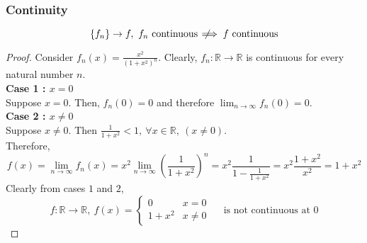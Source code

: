 \subsubsection{Continuity}
\[ \left\{f_n\right\} \to f,\ f_n \text{ continuous } \not\!\!\!\implies f \text{ continuous} \]
\begin{proof}
Consider $f_n(x) = \frac{x^2}{(1+x^2)^n}$.
	Clearly, $f_n : \mathbb{R} \to \mathbb{R}$ is continuous for every natural number $n$.\\

\textbf{Case 1 : $x = 0$}\\
Suppose $x = 0$.
Then, $f_n(0) = 0$ and therefore $\displaystyle\lim_{n \to \infty} f_n(0) = 0$. \\

\textbf{Case 2 : $x \ne 0$}\\
	Suppose $x \ne 0$.
	Then $\frac{1}{1+x^2} < 1,\ \forall x \in \mathbb{R},\ (x \ne 0)$.\\
Therefore,
\[ f(x) = \lim_{n \to \infty} f_n(x) = x^2 \lim_{n \to \infty} \left(\frac{1}{1+x^2}\right)^n = x^2 \frac{1}{1-\frac{1}{1+x^2}} = x^2 \frac{1+x^2}{x^2} = 1+x^2 \]
	Clearly from cases $1$ and $2$,\\
	\[ f : \mathbb{R} \to \mathbb{R},\ f(x)= \begin{cases} 0 & x = 0 \\ 1+x^2 & x \ne 0 \end{cases} \quad \text{ is not continuous at } 0 \]
\end{proof}
